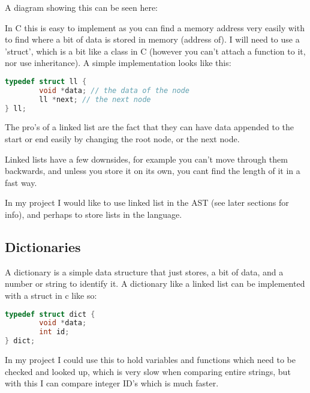 \documentclass[a4paper,12pt]{article}
\begin{document}
{A diagram showing this can be seen here:
\\


In C this is easy to implement as you can find a memory address very easily with to 
find where a bit of data is stored in memory (address of). I will need to use a 'struct', 
which is a bit like a class in C (however you can't attach a function to it, nor use 
inheritance). A simple implementation looks like this:

\begin{lstlisting}[language=C++, caption=Linked list example]
typedef struct ll {
        void *data; // the data of the node
        ll *next; // the next node
} ll;
\end{lstlisting}

The pro's of a linked list are the fact that they can have data appended to the start or 
end easily by changing the root node, or the next node.

Linked lists have a few downsides, for example you can't move through them backwards, 
and unless you store it on its own, you cant find the length of it in a fast way.

In my project I would like to use linked list in the AST (see later sections for info), 
and perhaps to store lists in the language.

\subsection{Dictionaries}
A dictionary is a simple data structure that just stores, a bit of data, and a number or 
string to identify it.
A dictionary like a linked list can be implemented with a struct in c like so:
\begin{lstlisting}[language=C++, caption=Dictionary example]
typedef struct dict {
        void *data;
        int id;
} dict;
\end{lstlisting}

In my project I could use this to hold variables and functions which need to be 
checked and looked up, which is very slow when comparing entire strings, but with this
I can compare integer ID's which is much faster.

}
\end{document}
